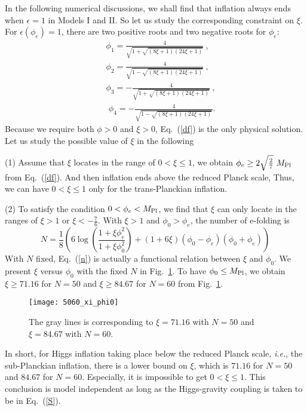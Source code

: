 \documentclass[aps,prd,preprint,superscriptaddress,showpacs,ctexart]{revtex4-1}
\begin{document}
In the following numerical discussions, we shall find that inflation
always ends when $\epsilon=1$ in Models I and II. So let us study
the corresponding constraint on $\xi$. For $\epsilon(\phi_{e})=1$,
there are two positive roots and two negative roots for $\phi_{e}$: 
\begin{eqnarray}
 &  & \phi_{1}=\frac{4}{\sqrt{1+\sqrt{(8\xi+1)(24\xi+1)}}}~,~\label{df}\\
 &  & \phi_{2}=\frac{4}{\sqrt{1-\sqrt{(8\xi+1)(24\xi+1)}}}~,~\\
 &  & \phi_{3}=-\frac{4}{\sqrt{1+\sqrt{(8\xi+1)(24\xi+1)}}}~,~
 \end{eqnarray}
 \begin{eqnarray}
 &  & \phi_{4}=-\frac{4}{\sqrt{1-\sqrt{(8\xi+1)(24\xi+1)}}}.
\end{eqnarray}
Because we require both $\phi>0$ and $\xi>0$, Eq.~(\ref{df})
is the only physical solution. Let us study the possible value of
$\xi$ in the following

(1) Assume that $\xi$ locates in the range of $0<\xi\leq1$, we
obtain $\phi_{e}\geq2\sqrt{\frac{2}{7}}~M_{{\rm Pl}}$ from Eq.~(\ref{df}).
And then inflation ends above the reduced Planck scale, Thus, we can
have $0<\xi\leq1$ only for the trans-Planckian inflation.

(2) To satisfy the condition $0<\phi_{e}<M_{{\rm Pl}}$, we find
that $\xi$ can only locate in the ranges of $\xi>1$ or $\xi<-\frac{7}{6}$.
With $\xi>1$ and $\phi_{0}>\phi_{e}$, the number of e-folding is
\begin{equation}
N=\frac{1}{8}\left(6\log\left(\frac{1+\xi\phi_{e}^{2}}{1+\xi\phi_{0}^{2}}\right)+(1+6\xi)(\phi_{0}-\phi_{e})(\phi_{0}+\phi_{e})\right)\label{n}
\end{equation}
With $N$ fixed, Eq.~(\ref{n}) is actually a functional relation
between $\xi$ and $\phi_{0}$. We present $\xi$ versus $\phi_{0}$
with the fixed $N$ in Fig.~\ref{fig:xi_phi0}. To have $\phi_{0}\leq M_{{\rm Pl}}$,
we obtain $\xi\geq71.16$ for $N=50$ and $\xi\geq84.67$ for $N=60$
from Fig.~\ref{fig:xi_phi0}.

\begin{figure}[H]
\centering
\texttt{[image: 5060\_xi\_phi0]}
\caption{The gray lines is corresponding to $\xi=71.16$ with $N=50$ and $\xi=84.67$
with $N=60$.}
\label{fig:xi_phi0} 
\end{figure}

In short, for Higgs inflation taking place below the reduced Planck
scale, \textit{{}i.e.}{}, the sub-Planckian inflation, there
is a lower bound on $\xi$, which is $71.16$ for $N=50$ and $84.67$
for $N=60$. Especially, it is impossible to get $0<\xi\leq1$. This
conclusion is model independent as long as the Higgs-gravity coupling
is taken to be in Eq.~(\ref{S}).
\end{document}
